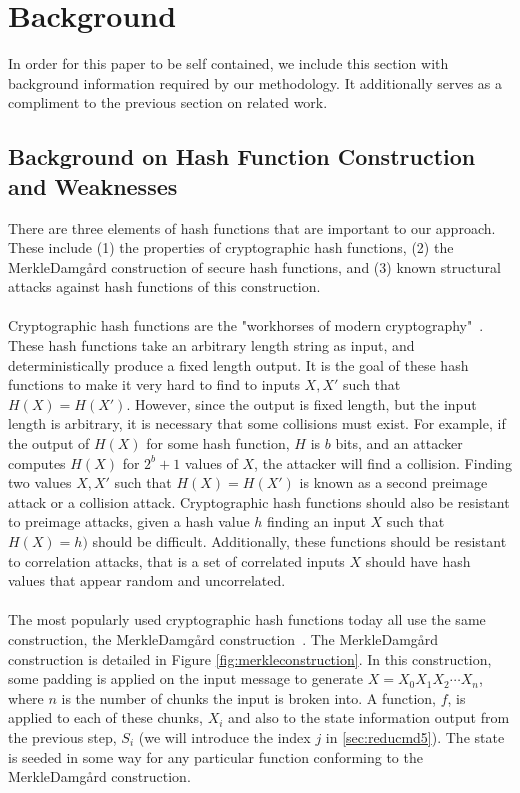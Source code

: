 \documentclass[letterpaper,twocolumn,10pt]{article}
\begin{document}
\section{Background}
In order for this paper to be self contained, we include this section with background information required by our methodology. It additionally serves as a compliment to the previous section on related work.

\subsection{Background on Hash Function Construction and Weaknesses} 
There are three elements of hash functions that are important to our approach. These include (1) the properties of cryptographic hash functions, (2) the Merkle{\textendash}Damg\r{a}rd construction of secure hash functions, and (3) known structural attacks against hash functions of this construction. 
\\
\\
Cryptographic hash functions are the "workhorses of modern cryptography"~\cite{bruce2004}. These hash functions take an arbitrary length string as input, and deterministically produce a fixed length output. It is the goal of these hash functions to make it very hard to find to inputs $X, X'$ such that $H(X) = H(X')$. However, since the output is fixed length, but the  input length is arbitrary, it is necessary that some collisions must exist. For example, if the output of $H(X)$ for some hash function, $H$ is $b$ bits, and an attacker computes $H(X)$ for $2^b + 1$ values of $X$, the attacker will find a collision. Finding two values $X, X'$ such that $H(X) = H(X')$ is known as a second preimage attack or a collision attack. Cryptographic hash functions should also be resistant to preimage attacks, given a hash value $h$ finding an input $X$ such that $H(X) = h)$ should be difficult. Additionally, these functions should be resistant to correlation attacks, that is a set of correlated inputs $X$ should have hash values that appear random and uncorrelated. 
\\
\\
The most popularly used cryptographic hash functions today all use the same construction, the Merkle{\textendash}Damg\r{a}rd construction~\cite{merkle1979secrecy, bruce2004}. The Merkle{\textendash}Damg\r{a}rd construction is detailed in Figure \ref{fig:merkleconstruction}. In this construction, some padding is applied on the input message to generate $X = X_0X_1X_2\cdots X_n$, where $n$ is the number of chunks the input is broken into. A function, $f$, is applied to each of these chunks, $X_i$ and also to the state information output from the previous step, $S_i$ (we will introduce the index $j$ in \ref{sec:reducmd5}). The state is seeded in some way for any particular function conforming to the Merkle{\textendash}Damg\r{a}rd construction. 
\end{document}
